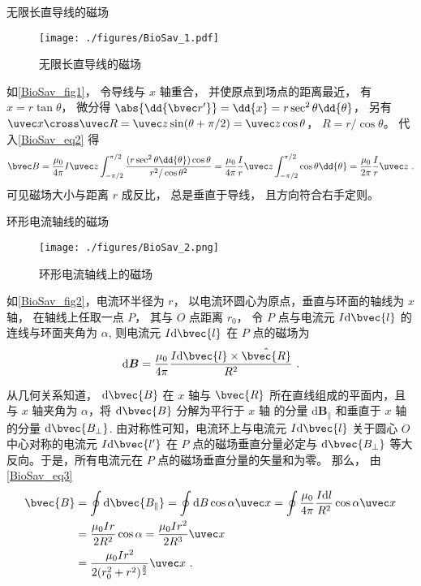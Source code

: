 \begin{example}{无限长直导线的磁场}\label{BioSav_ex1}
\begin{figure}[ht]
\centering
\texttt{[image: ./figures/BioSav\_1.pdf]}
\caption{无限长直导线的磁场} \label{BioSav_fig1}
\end{figure}
如\autoref{BioSav_fig1}， 令导线与 $x$ 轴重合， 并使原点到场点的距离最近， 有 $x = r\tan\theta$， 微分得 $\abs{\dd{\bvec r'}} = \dd{x} = r\sec^2\theta\dd{\theta}$， 另有 $\uvec x\cross\uvec R = \uvec z\sin(\theta + \pi/2) = \uvec z\cos\theta $， $R = r/\cos\theta$。 代入\autoref{BioSav_eq2} 得
\begin{equation}
\bvec B = \frac{\mu_0}{4\pi} I \uvec z\int_{-\pi/2}^{\pi/2} \frac{(r \sec^2\theta \dd{\theta}) \cos\theta}{r^2/\cos\theta^2}
= \frac{\mu_0}{4\pi} \frac Ir \uvec z\int_{-\pi/2}^{\pi/2} \cos\theta \dd{\theta}
= \frac{\mu_0}{2\pi} \frac Ir\uvec z~.
\end{equation}
可见磁场大小与距离 $r$ 成反比， 总是垂直于导线， 且方向符合右手定则。
\end{example}

\begin{example}{环形电流轴线的磁场}\label{BioSav_ex2}
\begin{figure}[ht]
\centering
\texttt{[image: ./figures/BioSav\_2.png]}
\caption{环形电流轴线上的磁场} \label{BioSav_fig2}
\end{figure}
如\autoref{BioSav_fig2}，电流环半径为 $r$， 以电流环圆心为原点，垂直与环面的轴线为 $x$ 轴， 在轴线上任取一点 $P$， 其与 $O$ 点距离 $r_0$， 令 $P$ 点与电流元 $I\mathrm{d}\bvec{l}$ 的连线与环面夹角为 $\alpha$, 则电流元 $I\mathrm{d}\bvec{l}$ 在 $P$ 点的磁场为
\begin{equation}
\mathrm{d}\boldsymbol{B}=\frac{\mu_0}{4\pi}\frac{I\mathrm{d}\bvec{l}\times\hat{\bvec{R}}}{R^2}~.
\end{equation}

从几何关系知道， $\mathrm{d}\bvec{B}$ 在 $x$ 轴与 $\bvec{R}$ 所在直线组成的平面内，且与 $x$ 轴夹角为 $\alpha$，将 $\mathrm{d}\bvec{B}$ 分解为平行于 $x$ 轴 的分量 $\mathrm{d}\boldsymbol{B_\parallel}$ 和垂直于 $x$ 轴的分量 $\mathrm{d}\bvec{B_\bot}$. 由对称性可知，电流环上与电流元 $I\mathrm{d}\bvec{l}$ 关于圆心 $O$ 中心对称的电流元 $I\mathrm{d}\bvec{l'}$ 在 $P$ 点的磁场垂直分量必定与 $\mathrm{d}\bvec{B_\bot}$ 等大反向。于是，所有电流元在 $P$ 点的磁场垂直分量的矢量和为零。 那么， 由\autoref{BioSav_eq3} 
\begin{equation}
\begin{aligned}
\bvec{B}&=\oint{\mathrm{d}\bvec{B_\parallel}}=\oint\mathrm{d}B\cos{\alpha}\uvec x=\oint\frac{\mu_0}{4\pi}\frac{I\mathrm{d}l}{R^2}\cos\alpha\uvec x\\
&=\frac{\mu_0Ir}{2R^2}\cos\alpha=\frac{\mu_0Ir^2}{2R^3}\uvec x\\
&=\frac{\mu_0Ir^2}{2(r_0^2+r^2)^{\frac{3}{2}}}\uvec x~.
\end{aligned}
\end{equation}
\end{example}

